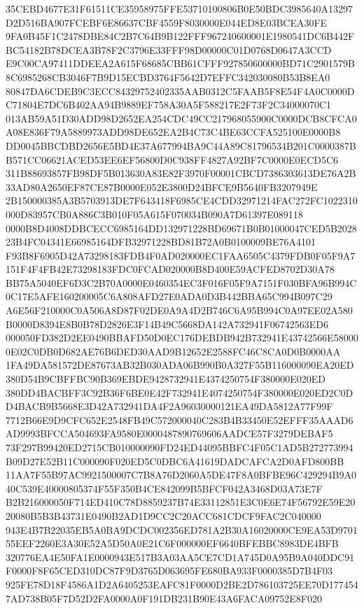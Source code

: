 \documentclass[UTF8,fontset=fandol,zihao=-4,a4paper]{ctexart}
\begin{document}
{{35CEBD4677E31F61511CE35958975FFE53710100806B0E50BDC3985640A13297D2D516BA907FCEBF6E86637CBF4559F8030000E044ED8E03BCEA30FE
9FA0B45F1C2478DBE84C2B7C64B9B122FFF967240600001E1980541DC6B442FBC54182B78DCEA3B78F2C3796E33FFF98D00000C01D0768D0647A3CCD
E9C00CA97411DDEEA2A615F68685CBB61CFFF927850600000BD71C2901579B8C6985268CB3046F7B9D15ECBD3764F5642D7EFFC342030080B53B8EA0
80847DA6CDEB9C3ECC84329752402335AAB0312C5FAAB5F8E54F4A0C0000DC71804E7DC6B402AA94B9889EF758A30A5F588217E2F73F2C34000070C1
013AB59A51D30ADD98D2652EA254CDC49CC217968055900C0000DCB8CFCA0A08E836F79A5889973ADD98DE652EA2B4C73C4BE63CCFA525100E0000B8
DD0045BBCDBD2656E5BD4E37A677994BA9C44A89C81796534B201C0000387BB571CC06621ACED53EE6EF56800D0C938FF4827A92BF7C0000E0ECD5C6
311B88693857FB98DF5B013630A83E82F3970F00001CBCD7386303613DE76A2B33AD80A2650EF87CE87B0000E052E3800D24BFCE9B5640FB3207949E
2B150000385A3B5703913DE7F643418F6985CE4CDD32971214FAC272FC1022310000D83957CB0A886C3B010F05A615F070034B090A7D61397E089118
0000B8D4008DDBCECC6985164DD132971228BD69671B0B01000047CED5B202823B4FC04341E66985164DFB32971228BD81B72A0B0100009BE76A4101
F93B8F6905D42A73298183FDB4F0AD020000EC1FAA6505C4379FDB0F05F9A7151F4F4FB42E73298183FDC0FCAD020000B8D400E59ACFED8702D30A78
BB75A5040EF6D3C2B70A0000E0460354EC3F016F05F9A7151F030BFA96B994C0C17E5AFE160200005C6A808AFD27E0ADA0D3B442BBA65C994B097C29
A6E56F210000C0A506A8D87F02DE0A9A4D2B746C6A95B994C0A97EE02A580B0000D8394E8B0B78D2826E3F14B49C5668DA142A732941F06742563ED6
000050FD382D2EE0490BBAFD50D0EC176DEBDB942B732941E43742566E580000E02C0DB0D682AE76B6DED30AAD9B12652E2588FC46C8CA0D0B0000AA
1FA49DA581572DE87673AB32B030ADA06B990B0A327F55B116000090EA20ED380D54B9CBFFBC90B369EBDE9428732941E4374250754F380000E020ED
380DD4BACBFF3C92B36F6BE0E42F732941E4074250754F380000E020ED2C0DD4BACB9B5668E3D42A732941DA4F2A96030000121EA49DA5812A77F99F
7712B66E9D9CFC652E2548FB49C572000040C283B4B33450E52EFFF35AAAD6AD9993BFCCA504693FA9580E0000487890769606AADCE57F3279DEBAF5
73F297B99420ED2715CB010000090FD24ED44095BBFC4F05C1AD5B272773994B09D27E52B11C000090F020ED5C0DBC6A41619DADCAFCA2D0AFD800BB
11AA7F55B97AC9921500007C7B8A76D2060A5DE47F8A0BFBE96C429294B9A040C539E40000805374F55F350B4CE842099B5BFCF042A3468D03A73E7F
B2B216000050F714ED410C78D8859237B74E33112851E3C0E6E74F56792E59E2020080B5B3B43731E0490B2AD1D9CC2C20ACC681CDCF9FAC2C040000
943E4B7B22035EB5A0BA9DCDC002356ED781A2B30A16020000CE9EA53D970155EEF2260E3A30E52A5D50A0E21C6F000000EF6640BFEBBC8983DE4BFB
320776EA4E50FA1E0000943E517B3A03AA5CE7CD1A745D0A95B9A040DDC91F0000F8F65CED310DC87F9D3765D063695FE680BA933F0000385D7B4F03
925FE78D18F4586A1D2A6405253EAFC81F0000D2BE2D786103725EE70D1774547AD738B05F7D52D2FA0000A0F191DB231B90E43A6FACA09752E8F020
}}
\end{document}

